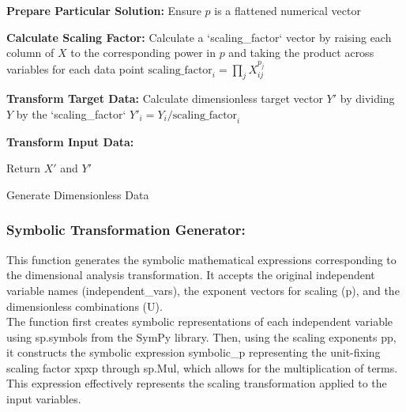\documentclass{article}
\begin{document}
\begin{algorithm}[H]
\SetAlgoLined
{}

\textbf{Prepare Particular Solution:}\;
Ensure \(p\) is a flattened numerical vector\;

\textbf{Calculate Scaling Factor:}\;
Calculate a `scaling_factor` vector by raising each column of \(X\) to the corresponding power in \(p\) and taking the product across variables for each data point\;
\( \text{scaling\_factor}_i = \prod_{j} X_{ij}^{p_j} \)\;

\textbf{Transform Target Data:}\;
Calculate dimensionless target vector \(Y'\) by dividing \(Y\) by the `scaling_factor`\;
\( Y'_i = Y_i / \text{scaling\_factor}_i \)\;

\textbf{Transform Input Data:}\;

Return \(X'\) and \(Y'\)\;

\caption{Generate Dimensionless Data}
\label{alg:generate_dimensionless_data} %
\end{algorithm}






\subsubsection{Symbolic Transformation Generator: }

This function generates the symbolic mathematical expressions corresponding to the dimensional analysis transformation. It accepts the original independent variable names (independent_vars), the exponent vectors for scaling (p), and the dimensionless combinations (U).\\

The function first creates symbolic representations of each independent variable using sp.symbols from the SymPy library. Then, using the scaling exponents pp, it constructs the symbolic expression symbolic_p representing the unit-fixing scaling factor xpxp through sp.Mul, which allows for the multiplication of terms. This expression effectively represents the scaling transformation applied to the input variables.\\
\end{document}
